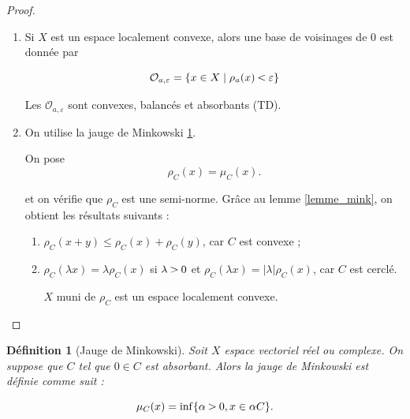 \documentclass[french]{book}
\newtheorem{definition}{Définition}[section]
\newcommand{\lesss}{\rotatebox[origin=c]{90}{$\land$}}
\newcommand{\less}{\ \lesss\ }
\newcommand{\biggg}{\rotatebox[origin=c]{90}{$\lor$}}
\newcommand{\bg}{\ \biggg\ }
\begin{document}
\begin{proof}
  \begin{enumerate}
    \item Si $X$ est un espace localement convexe, alors une base de voisinages de 0 est donnée par

    \[
    \mathcal{O} _{a, \varepsilon } = \{ x  \in X \mid \rho_a(x) \less \varepsilon  \}
    \]

    Les $\mathcal{O} _{a, \varepsilon }$ sont convexes, balancés et absorbants (TD).

    \item On utilise la jauge de Minkowski \ref{jauge_mink}.

    On pose \[
    \rho_C(x) = \mu_C(x).
    \]

    et on vérifie que $\rho_C$ est une semi-norme. Grâce au lemme \ref{lemme_mink}, on obtient les résultats suivants :

    \begin{enumerate}
      \item $\rho_C(x+y) \leq \rho_C(x)+ \rho_C(y)$, car $C$ est convexe ;
      \item $\rho_C(\lambda x) = \lambda \rho_C(x)$ si $\lambda \bg 0$ et $\rho_C(\lambda x) = \lvert \lambda  \rvert \rho_C(x)$, car $C$ est cerclé.




      $X$ muni de $\rho_C$ est un espace localement convexe.
    \end{enumerate}
  \end{enumerate}
\end{proof}

\begin{definition}[Jauge de Minkowski] \label{jauge_mink}
  Soit $X$ espace vectoriel réel ou complexe. On suppose que $C$ tel que $0 \in C$ est absorbant. Alors la jauge de Minkowski est définie comme suit :

  \[
  \mu_C(x) = \inf \{ \alpha \bg 0, x \in \alpha C \}.
  \]
\end{definition}
\end{document}

